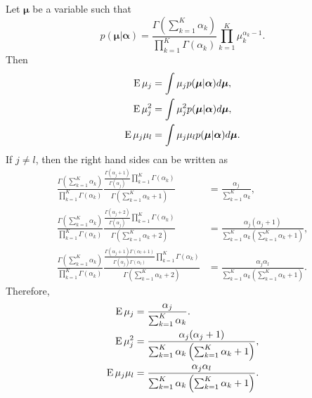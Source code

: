 \subsection{}
\label{2.10}
Let $\bm{\mu}$ be a variable such that
%
\begin{equation}
p(\bm{\mu} | \bm{\alpha}) 
= 
\frac
{\Gamma(\sum_{k = 1}^{K} \alpha_k)}
{\prod_{k = 1}^{K} \Gamma(\alpha_k)} \prod_{k = 1}^{K} \mu_k ^ {\alpha_k - 1}.
\end{equation}
%
Then
%
\begin{equation}
\begin{aligned}
\operatorname{E} \mu_j 
&= 
\int 
\mu_j 
p(\bm{\mu} | \bm{\alpha}) 
d\bm{\mu}, 
\\
\operatorname{E} \mu_j ^ 2 
&= 
\int 
\mu_j ^ 2 
p(\bm{\mu} | \bm{\alpha}) 
d\bm{\mu}, \\
\operatorname{E} \mu_j \mu_l 
&= 
\int 
\mu_j 
\mu_l p(\bm{\mu} | \bm{\alpha}) 
d\bm{\mu}.
\end{aligned}
\end{equation}
%
If $j \neq l$, then the right hand sides can be written as
%
\begin{equation}
\begin{aligned}
\frac
{\Gamma (\sum_{k = 1}^{K} \alpha_k)}
{\prod_{k = 1}^{K} \Gamma(\alpha_k)} 
\frac
{\frac{\Gamma(\alpha_j + 1)}{\Gamma(\alpha_j)} \prod_{k = 1}^{K} \Gamma(\alpha_k)}
{\Gamma(\sum_{k = 1}^{K} \alpha_k + 1)} 
&= 
\frac{\alpha_j}{\sum_{k = 1}^{K} \alpha_k}, 
\\
\frac
{\Gamma(\sum_{k = 1}^{K} \alpha_k)}
{\prod_{k = 1}^{K} \Gamma(\alpha_k)} 
\frac
{\frac{\Gamma(\alpha_j + 2)} {\Gamma(\alpha_j)} \prod_{k = 1}^{K} \Gamma(\alpha_k)}
{\Gamma \left( \sum_{k = 1}^{K} \alpha_k + 2 \right)} 
&= 
\frac
{\alpha_j (\alpha_j + 1)}
{\sum_{k = 1}^{K} \alpha_k (\sum_{k = 1}^{K} \alpha_k + 1)}, 
\\
\frac
{\Gamma \left( \sum_{k = 1}^{K} \alpha_k \right)}
{\prod_{k = 1}^{K} \Gamma(\alpha_k)} 
\frac
{\frac{\Gamma(\alpha_j + 1) \Gamma(\alpha_l + 1)}{\Gamma(\alpha_j) \Gamma(\alpha_l)} \prod_{k = 1}^{K} \Gamma(\alpha_k)}
{\Gamma \left( \sum_{k = 1}^{K} \alpha_k + 2 \right)} 
&= 
\frac
{\alpha_j \alpha_l}
{\sum_{k = 1}^{K} \alpha_k (\sum_{k = 1}^{K} \alpha_k + 1)}.
\end{aligned}
\end{equation}
%
Therefore,
%
\begin{equation}
\begin{aligned}
\operatorname{E} \mu_j 
&= 
\frac
{\alpha_j}
{\sum_{k = 1}^{K} \alpha_k}. 
\\
\operatorname{E} \mu_j ^ 2 
&= 
\frac
{\alpha_j (\alpha_j + 1)}
{\sum_{k = 1}^{K} \alpha_k \left( \sum_{k = 1}^{K} \alpha_k + 1 \right)}, 
\\
\operatorname{E} \mu_j \mu_l 
&= 
\frac{\alpha_j \alpha_l}
{\sum_{k = 1}^{K} \alpha_k \left( \sum_{k = 1}^{K} \alpha_k + 1 \right)}.
\end{aligned}
\end{equation}
